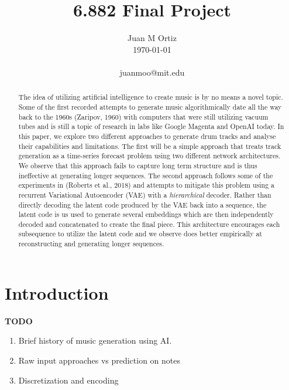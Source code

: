 \documentclass[10pt,twocolumn]{article}
\begin{document}
\title{6.882 Final Project}

\author{Juan M Ortiz \\
\today
\\
\\
juanmoo@mit.edu  \\
}

\maketitle

\begin{abstract}
  The idea of utilizing artificial intelligence to create music is by no means a novel topic. Some of the first recorded attempts to generate music algorithmically date all the way back to the 1960s (Zaripov, 1960) \cite{zaripov1960algorithmic} with computers that were still utilizing vacuum tubes and is still a topic of research in labs like Google Magenta and OpenAI today. In this paper, we explore two different approaches to generate drum tracks and analyse their capabilities and limitations. The first will be a simple approach that treats track generation as a time-series forecast problem using two different network architectures. We observe that this approach fails to capture long term structure and is thus ineffective at generating longer sequences. The second approach follows some of the experiments in (Roberts et al., 2018) \cite{roberts2018hierarchical} and attempts to mitigate this problem using a recurrent Variational Autoencoder (VAE) with a \textit{hierarchical} decoder. Rather than directly decoding the latent code produced by the VAE back into a sequence, the latent code is us used to generate several embeddings which are then independently decoded and concatenated to create the final piece. This architecture encourages each subsequence to utilize the latent code and we observe does better empirically at reconstructing and generating longer sequences.

\end{abstract}


\section{Introduction}
\textbf{TODO}
\begin{enumerate}
  \item Brief history of music generation using AI.
  \item Raw input approaches vs prediction on notes
  \item Discretization and encoding
\end{enumerate}
\end{document}
